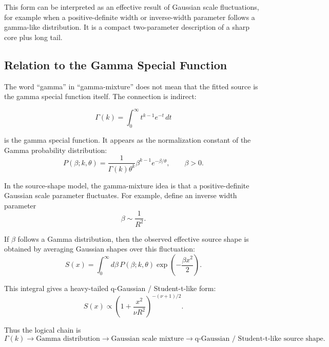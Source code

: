 \documentclass[11pt]{article}
\begin{document}
This form can be interpreted as an effective result of Gaussian scale
fluctuations, for example when a positive-definite width or inverse-width
parameter follows a gamma-like distribution. It is a compact two-parameter
description of a sharp core plus long tail.

\subsection*{Relation to the Gamma Special Function}

The word ``gamma'' in ``gamma-mixture'' does not mean that the fitted source
is the gamma special function itself. The connection is indirect:

\begin{equation}
  \Gamma(k)
  =
  \int_0^\infty t^{k-1}e^{-t}\,dt
\end{equation}

is the gamma special function. It appears as the normalization constant of the
Gamma probability distribution:
\begin{equation}
  P(\beta;k,\theta)
  =
  \frac{1}{\Gamma(k)\theta^k}
  \beta^{k-1}e^{-\beta/\theta},
  \qquad \beta > 0.
\end{equation}

In the source-shape model, the gamma-mixture idea is that a positive-definite
Gaussian scale parameter fluctuates. For example, define an inverse width
parameter
\begin{equation}
  \beta \sim \frac{1}{R^2}.
\end{equation}

If \(\beta\) follows a Gamma distribution, then the observed effective source
shape is obtained by averaging Gaussian shapes over this fluctuation:
\begin{equation}
  S(x)
  =
  \int_0^\infty d\beta\,
  P(\beta;k,\theta)
  \exp\!\left(-\frac{\beta x^2}{2}\right).
\end{equation}

This integral gives a heavy-tailed q-Gaussian / Student-t-like form:
\begin{equation}
  S(x)
  \propto
  \left(
  1+\frac{x^2}{\nu R^2}
  \right)^{-(\nu+1)/2}.
\end{equation}

Thus the logical chain is
\begin{equation}
  \Gamma(k)
  \rightarrow
  \text{Gamma distribution}
  \rightarrow
  \text{Gaussian scale mixture}
  \rightarrow
  \text{q-Gaussian / Student-t-like source shape}.
\end{equation}
\end{document}
